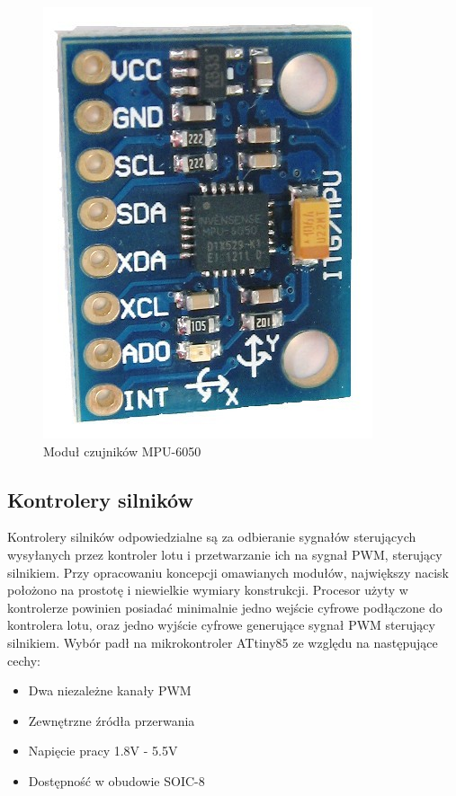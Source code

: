 \begin{figure}[H]
	\centering
	\includegraphics[scale=0.6]{Pictures/mpu-6050.jpg}
		\caption[Moduł czujników MPU-6050]{Moduł czujników MPU-6050}
	\label{fig:mpu-6050}
\end{figure}

\subsection{Kontrolery silników}
Kontrolery silników odpowiedzialne są za odbieranie sygnałów sterujących wysyłanych przez kontroler lotu i przetwarzanie ich na sygnał PWM, sterujący silnikiem. Przy opracowaniu koncepcji omawianych modułów, największy nacisk położono na prostotę i niewielkie wymiary konstrukcji. Procesor użyty w kontrolerze powinien posiadać minimalnie jedno wejście cyfrowe podłączone do kontrolera lotu, oraz jedno wyjście cyfrowe generujące sygnał PWM sterujący silnikiem. Wybór padł na mikrokontroler ATtiny85 ze względu na następujące cechy:

\begin{itemize}
	\item Dwa niezależne kanały PWM
	\item Zewnętrzne źródła przerwania
	\item Napięcie pracy 1.8V - 5.5V
	\item Dostępność w obudowie SOIC-8
\end{itemize}

